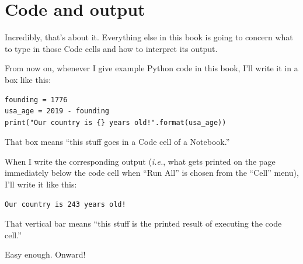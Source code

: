 
\section{Code and output}

Incredibly, that's about it. Everything else in this book is going to concern
what to type in those Code cells and how to interpret its output.

From now on, whenever I give example Python code in this book, I'll write it in
a box like this:


\begin{Verbatim}[fontsize=\small,samepage=true,frame=single,framesep=3mm]
founding = 1776
usa_age = 2019 - founding
print("Our country is {} years old!".format(usa_age))
\end{Verbatim}

That box means ``this stuff goes in a Code cell of a Notebook.''

When I write the corresponding output (\textit{i.e.}, what gets printed on the
page immediately below the code cell when ``Run All'' is chosen from the
``Cell'' menu), I'll write it like this:
  
\begin{Verbatim}[fontsize=\small,samepage=true,frame=leftline,framesep=5mm,framerule=1mm]
Our country is 243 years old!
\end{Verbatim}

That vertical bar means ``this stuff is the printed result of executing the
code cell.''

Easy enough. Onward!
